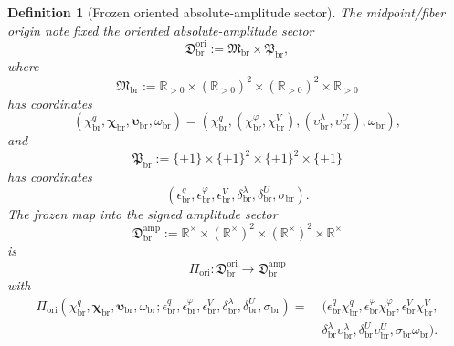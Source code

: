\documentclass[11pt]{article}
\newcommand{\LiftSector}{\mathfrak D_{\mathrm{br}}^{\mathrm{amp}}}
\newcommand{\OriginSector}{\mathfrak D_{\mathrm{br}}^{\mathrm{ori}}}
\newcommand{\AbsAmpSector}{\mathfrak M_{\mathrm{br}}}
\newcommand{\PolaritySector}{\mathfrak P_{\mathrm{br}}}
\newcommand{\AbsReadAmp}{\chi_{\mathrm{br}}^{q}}
\newcommand{\AbsCovAmp}{\chi_{\mathrm{br}}^{\varphi}}
\newcommand{\AbsRelaxAmp}{\chi_{\mathrm{br}}^{V}}
\newcommand{\AbsKinAmp}{\bm\chi_{\mathrm{br}}}
\newcommand{\AbsWellAmp}{\upsilon_{\mathrm{br}}^{\lambda}}
\newcommand{\AbsEqAmp}{\upsilon_{\mathrm{br}}^{U}}
\newcommand{\AbsAnchorAmp}{\bm\upsilon_{\mathrm{br}}}
\newcommand{\AbsScaleAmp}{\omega_{\mathrm{br}}}
\newcommand{\PolRead}{\epsilon_{\mathrm{br}}^{q}}
\newcommand{\PolCov}{\epsilon_{\mathrm{br}}^{\varphi}}
\newcommand{\PolRelax}{\epsilon_{\mathrm{br}}^{V}}
\newcommand{\PolWell}{\delta_{\mathrm{br}}^{\lambda}}
\newcommand{\PolEq}{\delta_{\mathrm{br}}^{U}}
\newcommand{\PolScale}{\sigma_{\mathrm{br}}}
\newcommand{\OriginMap}{\Pi_{\mathrm{ori}}}
\newcommand{\Rstar}{\mathbb R^{\times}}
\newtheorem{definition}{Definition}
\begin{document}
\begin{definition}[Frozen oriented absolute-amplitude sector]
\label{def:frozenorigin}
The midpoint/fiber origin note fixed the oriented absolute-amplitude sector
\begin{equation}
\OriginSector
:=
\AbsAmpSector\times\PolaritySector,
\label{eq:originsector}
\end{equation}
where
\begin{equation}
\AbsAmpSector
:=
\mathbb R_{>0}\times(\mathbb R_{>0})^{2}\times(\mathbb R_{>0})^{2}\times\mathbb R_{>0}
\label{eq:abssector}
\end{equation}
has coordinates
\begin{equation}
(\AbsReadAmp,\AbsKinAmp,\AbsAnchorAmp,\AbsScaleAmp)
=
(\AbsReadAmp,(\AbsCovAmp,\AbsRelaxAmp),(\AbsWellAmp,\AbsEqAmp),\AbsScaleAmp),
\label{eq:abscoords}
\end{equation}
and
\begin{equation}
\PolaritySector
:=
\{\pm1\}\times\{\pm1\}^{2}\times\{\pm1\}^{2}\times\{\pm1\}
\label{eq:polsector}
\end{equation}
has coordinates
\begin{equation}
(\PolRead,\PolCov,\PolRelax,\PolWell,\PolEq,\PolScale).
\label{eq:polcoords}
\end{equation}
The frozen map into the signed amplitude sector
\begin{equation}
\LiftSector
:=
\Rstar\times(\Rstar)^{2}\times(\Rstar)^{2}\times\Rstar
\label{eq:liftsector}
\end{equation}
is
\begin{equation}
\OriginMap:\OriginSector\longrightarrow\LiftSector
\label{eq:originmap}
\end{equation}
with
\begin{align}
\OriginMap(\AbsReadAmp,\AbsKinAmp,\AbsAnchorAmp,\AbsScaleAmp;\PolRead,\PolCov,\PolRelax,\PolWell,\PolEq,\PolScale)
=\;&
(\PolRead\AbsReadAmp,\PolCov\AbsCovAmp,\PolRelax\AbsRelaxAmp,
\nonumber\\
&\PolWell\AbsWellAmp,\PolEq\AbsEqAmp,\PolScale\AbsScaleAmp).
\label{eq:originmapexplicit}
\end{align}
\end{definition}
\end{document}
